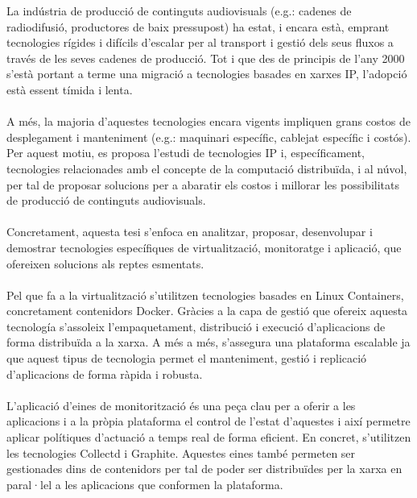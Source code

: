 \documentclass[english,final]{setup/eetac_tfc_pfc}
\begin{document}

\beforepreface  


\begin{resum}{10cm}
  La indústria de producció de continguts audiovisuals (e.g.: cadenes de radiodifusió, productores de baix pressupost) ha estat, i encara està, emprant tecnologies rígides i difícils d'escalar per al transport i gestió dels seus fluxos a través de les seves cadenes de producció. Tot i que des de principis de l'any 2000 s'està portant a terme una migració a tecnologies basades en xarxes IP, l'adopció està essent tímida i lenta.
  \\
  \\
  A més, la majoria d'aquestes tecnologies encara vigents impliquen grans costos de des\-ple\-ga\-ment i manteniment (e.g.: maquinari específic, cablejat específic i costós). Per aquest motiu, es proposa l'estudi de tecnologies IP i, específicament, tecnologies relacionades amb el concepte de la computació distribuïda, i al núvol, per tal de proposar solucions per a abaratir els costos i millorar les possibilitats de producció de continguts audiovisuals.
  \\
  \\
  Concretament, aquesta tesi s'enfoca en analitzar, proposar, desenvolupar i demostrar tecnologies específiques de virtualització, monitoratge i aplicació, que ofereixen solucions als reptes esmentats.
  \\
  \\
  Pel que fa a la virtualització s'utilitzen tecnologies basades en Linux Containers, concretament contenidors Docker. Gràcies a la capa de gestió que ofereix aquesta tecnología s'assoleix l'empaquetament, distribució i execució d'aplicacions de forma distribuïda a la xarxa. A més a més, s'assegura una plataforma escalable ja que aquest tipus de tecnologia permet el manteniment, gestió i replicació d'aplicacions de forma ràpida i robusta.
  \\
  \\
  L'aplicació d'eines de monitorització és una peça clau per a oferir a les aplicacions i a la pròpia plataforma el control de l'estat d'aquestes i així permetre aplicar polítiques d'actuació a temps real de forma eficient. En concret, s'utilitzen les tecnologies Collectd i Graphite. Aquestes eines també permeten ser gestionades dins de contenidors per tal de poder ser distribuïdes per la xarxa en paral·lel a les aplicacions que conformen la plataforma. 

\end{resum}
\end{document}
